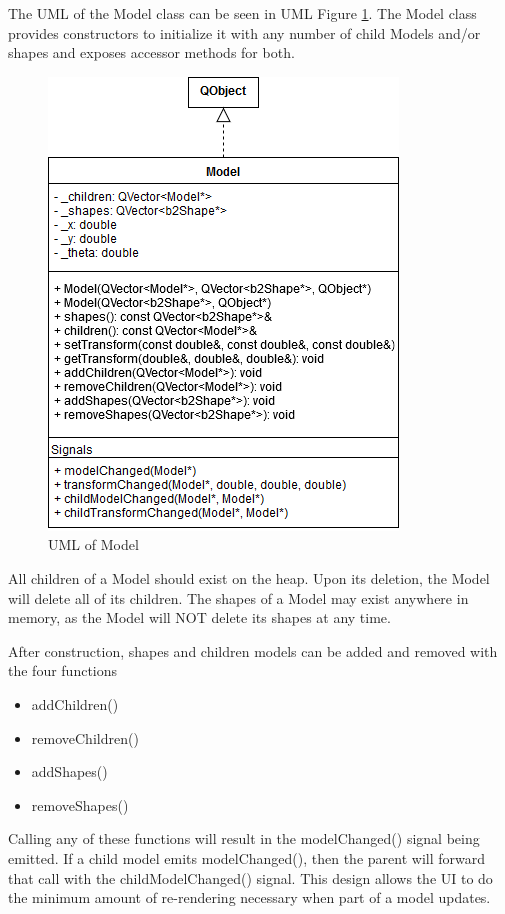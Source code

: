  	The UML of the Model class can be seen in UML Figure \ref{uml:model}. The Model class provides constructors to initialize it with any number of child Models and/or shapes and exposes accessor methods for both.

 \begin{figure}[h]
 	\begin{center}
 	\includegraphics[scale=0.5]{./images_design/uml/Model}
 	\caption{UML of Model\label{uml:model}}
 	\end{center}
 \end{figure}  
 
 All children of a Model should exist on the heap. Upon its deletion, the Model will delete all of its children. The shapes of a Model may exist anywhere in memory, as the Model will NOT delete its shapes at any time. 
 
After construction, shapes and children models can be added and removed with the four functions
 \begin{itemize}
 	\item addChildren()
 	\item removeChildren()
 	\item addShapes()
 	\item removeShapes()
 \end{itemize} 
 
 Calling any of these functions will result in the modelChanged() signal being emitted. If a child model emits modelChanged(), then the parent will forward that call with the childModelChanged() signal. This design allows the UI to do the minimum amount of re-rendering necessary when part of a model updates.
 
